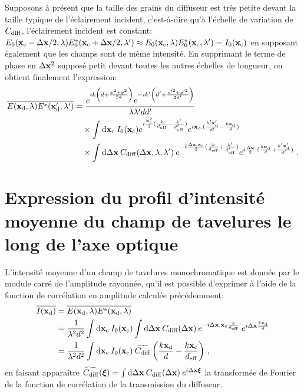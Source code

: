 Supposons à présent que la taille des grains du diffuseur est très petite devant la taille typique de l'éclairement incident, c'est-à-dire qu'à l'échelle de variation de $C_{\mathrm{diff}}$, l'éclairement incident est constant: $E_0(\mathbf{x}_{\mathrm{c}}-\Delta\mathbf{x}/2,\lambda) E_0^*(\mathbf{x}_{\mathrm{c}}+\Delta\mathbf{x}/2,\lambda') \approx E_0(\mathbf{x}_{\mathrm{c}},\lambda) E_0^*(\mathbf{x}_{\mathrm{c}},\lambda') = I_0(\mathbf{x}_{\mathrm{c}})$ en supposant également que les champs sont de même intensité. En supprimant le terme de phase en $\Delta\mathbf{x}^2$ supposé petit devant toutes les autres échelles de longueur, on obtient finalement l'expression:
\begin{align}
\overline{E(\mathbf{x}_{\mathrm{d}},\lambda)E^*(\mathbf{x}_{\mathrm{d}}',\lambda')} &= \frac{e^{ik\left( d + \frac{x^2+y^2}{2d} \right)} e^{-ik' \left( d' + \frac{x'^2+y'^2}{2d'}\right)}}{\lambda \lambda' d d'} \\
\nonumber & \quad \times \int{\mathop{}\mathopen{}\mathrm{d}\mathbf{x}_{\mathrm{c}}\: I_0(\mathbf{x}_{\mathrm{c}}) e^{i\frac{\mathbf{x}_{\mathrm{c}}^2}{2}(\frac{k}{d_{\mathrm{eff}}} - \frac{k'}{d_{\mathrm{eff}}'})} e^{i \mathbf{x}_{\mathrm{c}}. (\frac{k' \mathbf{x}_{\mathrm{d}}'}{d'}-\frac{k \mathbf{x}_{\mathrm{d}}}{d})}} \\
\nonumber & \quad \times \int{\mathop{}\mathopen{}\mathrm{d}\Delta\mathbf{x}\: C_{\mathrm{diff}}(\Delta\mathbf{x},\lambda,\lambda') \: e^{-i\frac{\Delta\mathbf{x}. \mathbf{x}_{\mathrm{c}}}{2}(\frac{k}{d_{\mathrm{eff}}} + \frac{k'}{d_{\mathrm{eff}}'})} e^{i\frac{\Delta\mathbf{x}}{2}. (\frac{k \mathbf{x}_{\mathrm{d}}}{d} +\frac{k' \mathbf{x}_{\mathrm{d}}'}{d'})}} \text{ .}
\label{eq:fonction_correlation_generale}
\end{align}




\section{Expression du profil d'intensité moyenne du champ de tavelures le long de l'axe optique}
L'intensité moyenne d'un champ de tavelures monochromatique est donnée par le module carré de l'amplitude rayonnée, qu'il est possible d'exprimer à l'aide de la fonction de corrélation en amplitude calculée précédemment:
\begin{align}
\overline{I(\mathbf{x}_{\mathrm{d}})} &= \overline{E(\mathbf{x}_{\mathrm{d}},\lambda) E^*(\mathbf{x}_{\mathrm{d}},\lambda)} \\
&= \frac{1}{\lambda^2 d^2} \int{\mathop{}\mathopen{}\mathrm{d}\mathbf{x}_{\mathrm{c}}\: I_0(\mathbf{x}_{\mathrm{c}}) \int{\mathop{}\mathopen{}\mathrm{d}\Delta\mathbf{x}\: C_{\mathrm{diff}}(\Delta\mathbf{x}) \: e^{-i \Delta\mathbf{x}. \mathbf{x}_{\mathrm{c}}\frac{k}{d_{\mathrm{eff}}}} \: e^{i\Delta\mathbf{x}\frac{k \mathbf{x}_{\mathrm{d}}}{d}}}} \\
&= \frac{1}{\lambda^2 d^2} \int{\mathop{}\mathopen{}\mathrm{d}\mathbf{x}_{\mathrm{c}}\: I_0(\mathbf{x}_{\mathrm{c}}) \: \widetilde{C_{\mathrm{diff}}}\left(\frac{k\mathbf{x}_{\mathrm{d}}}{d} - \frac{k\mathbf{x}_{\mathrm{c}}}{d_{\mathrm{eff}}}\right)} \text{ ,}
\end{align}
en faisant apparaître $\widetilde{C_{\mathrm{diff}}}(\boldsymbol{\xi})= \int{\mathop{}\mathopen{}\mathrm{d}\Delta\mathbf{x}\: C_{\mathrm{diff}}(\Delta\mathbf{x}) \: e^{i\Delta\mathbf{x}\boldsymbol{\xi}}}$ la transformée de Fourier de la fonction de corrélation de la transmission du diffuseur.

